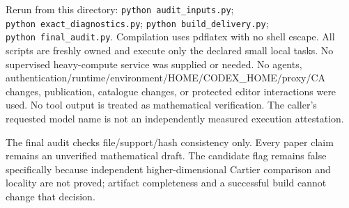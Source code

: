 \documentclass[
  11pt,
]{article}
\begin{document}
Rerun from this directory: \texttt{python\ audit\_inputs.py};
\texttt{python\ exact\_diagnostics.py};
\texttt{python\ build\_delivery.py}; \texttt{python\ final\_audit.py}.
Compilation uses pdflatex with no shell escape. All scripts are freshly
owned and execute only the declared small local tasks. No supervised
heavy-compute service was supplied or needed. No agents,
authentication/runtime/environment/HOME/CODEX\_HOME/proxy/CA changes,
publication, catalogue changes, or protected editor interactions were
used. No tool output is treated as mathematical verification. The
caller's requested model name is not an independently measured execution
attestation.

The final audit checks file/support/hash consistency only. Every paper
claim remains an unverified mathematical draft. The candidate flag
remains false specifically because independent higher-dimensional
Cartier comparison and locality are not proved; artifact completeness
and a successful build cannot change that decision.
\end{document}
